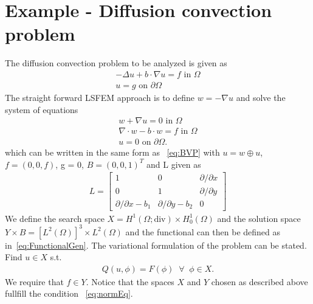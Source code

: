 \section{Example - Diffusion convection problem}
%
The diffusion convection problem to be analyzed is given as 
\begin{align}
	-\Delta u + b \cdot \nabla u = f \text{ in } \Omega \\
	u = g \text{ on } \partial \Omega
	\label{eq:DiffTrans}
\end{align}
The straight forward LSFEM approach is to define $w = -\nabla u$ and solve the system of equations 
\begin{align}
	w + \nabla u = 0 \text{ in } \Omega \\
	\nabla \cdot w - b \cdot w = f \text{ in } \Omega \\
	u = 0 \text{ on } \partial \Omega.
	\label{eq:DiffTransSystem}
\end{align}
which can be written in the same form as ~\ref{eq:BVP} with $ u = w \oplus u $, $f = (0,0,f)$, g = 0, $B = (0,0,1)^T $ and L given as 
\begin{align}
	L =
	\begin{bmatrix}
		1 & 0 & \partial / \partial x  \\
		0 & 1 & \partial / \partial y  \\
		\partial / \partial x - b_1 & \partial/ \partial y -b_2 & 0
	\end{bmatrix}
	\label{eq:AmatrixDiff}
\end{align}
We define the search space $X =  H^1(\Omega;\text{div}) \times H_0^1(\Omega)$ and the solution space $Y \times B  = [L^2(\Omega)]^3\times L^2(\Omega) $ and the functional can then be defined as in~\ref{eq:FunctionalGen}. The variational formulation of the problem can be stated. Find $ u \in X $ s.t.
\begin{align}
	Q(u,\phi) = F(\phi) \;\; \forall \;\; \phi \in X.
	\label{eq:VariationalFormulationPoisson}
\end{align}
We require that $f \in Y$.
Notice that the spaces $X$ and $Y$ chosen as described above fullfill the condition ~\ref{eq:normEq}. 


